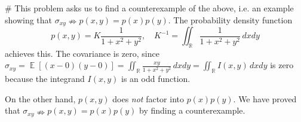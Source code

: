 \documentclass[12pt, a4paper]{article}
\newcommand{\R}{\mathbb{R}}
\DeclareMathOperator{\E}{\mathbb{E}}
\begin{document}
\begin{easylist}[enumerate]
# This problem asks us to find a counterexample of the above, i.e. an example showing that $\sigma_{xy} \nRightarrow p(x, y) = p(x) p(y)$.
The probability density function
\begin{equation*}
	p(x, y) = K \frac{1}{1 + x^2 + y^2}, \quad K^{-1} = \iint_{\R} \frac{1}{1 + x^2 + y^2} \, dx dy
\end{equation*}
achieves this.
The covariance is zero, since $\sigma_{xy} = \E \left[ (x - 0) (y - 0)\right] = \iint_{\R} \frac{x y}{1 + x^2 + y^2} \, dx dy = \iint_{\R} I(x, y) \, dx dy$ is zero because the integrand $I(x, y)$ is an odd function.

On the other hand, $p(x, y)$ does \emph{not} factor into $p(x) p(y)$.
We have proved that $\sigma_{xy} \nRightarrow p(x, y) = p(x) p(y)$ by finding a counterexample.
\end{easylist}
\end{document}
